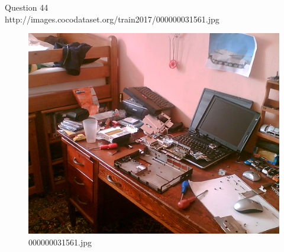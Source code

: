Question 44\\
http://images.cocodataset.org/train2017/000000031561.jpg
\begin{figure}[h]
    \centering
    \includegraphics[width=0.8\linewidth]{../image set/hard/000000031561.jpg}
    \caption{000000031561.jpg}
\end{figure}
